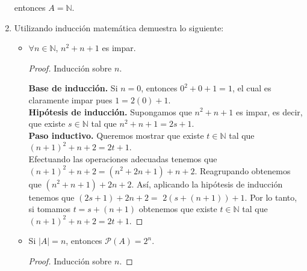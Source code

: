 \documentclass[letterpaper,11pt]{article}
\begin{document}
\begin{enumerate}
        entonces $A = \mathbb{N}$.
        
        \item Utilizando inducción matemática demuestra lo siguiente:
       
        \begin{itemize}
            
            \item $\forall n \in \mathbb{N}$, $n^{2} + n + 1$ es impar.
            
            \begin{proof}
                Inducción sobre $n$. 
                
                \textbf{Base de inducción.} Si $n = 0$, entonces 
                $0^{2} + 0 + 1 = 1$, el cual es claramente impar pues
                $1 = 2(0) + 1$. \\ 
                
                \textbf{Hipótesis de inducción.} Supongamos que 
                $n^{2} + n + 1$ es impar, es decir, que existe 
                $s \in \mathbb{N}$ tal que $n^{2} + n + 1 = 2s + 1$. \\
                
                \textbf{Paso inductivo.} Queremos mostrar que existe
                $t \in \mathbb{N}$ tal que $(n + 1)^{2} + n + 2 = 2t + 1$. \\
                Efectuando las operaciones adecuadas tenemos que 
                $(n + 1)^{2} + n + 2 = (n^{2} + 2n + 1) + n + 2$. Reagrupando
                obtenemos que $(n^{2} + n + 1) + 2n + 2$. Así, aplicando la 
                hipótesis de inducción tenemos que  $(2s + 1) + 2n + 2 =$
                $2(s + (n + 1)) + 1$. Por lo tanto, si tomamos $t = s + (n + 1)$
                obtenemos que existe $t \in \mathbb{N}$ tal que 
                $(n + 1)^{2} + n + 2 = 2t + 1$.
                
            \end{proof}
            
            \item Si $|A|= n$, entonces $\mathcal{P}(A) = 2^{n}$.
            
            \begin{proof}
                Inducción sobre $n$. 
                

\end{proof}
\end{itemize}
\end{enumerate}
\end{document}
